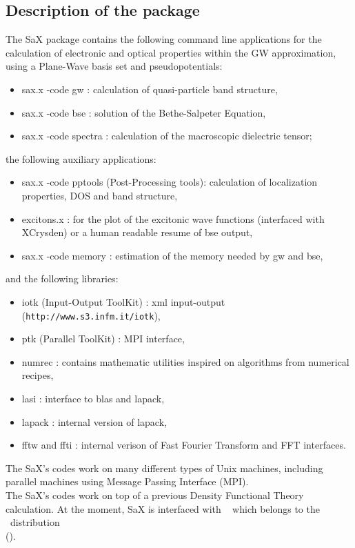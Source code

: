 \documentclass[11pt]{article}
\begin{document}
\subsection{Description of the package}
The SaX package contains the following command line applications for the
calculation of electronic and optical properties within
the GW approximation, using a Plane-Wave basis set and
pseudopotentials:
\begin{itemize}
  \item sax.x -code gw : calculation of quasi-particle band structure,
  \item sax.x -code bse : solution of the Bethe-Salpeter Equation,
  \item sax.x -code spectra : calculation of the macroscopic dielectric tensor;
\end{itemize}
the following auxiliary applications:
\begin{itemize}
  \item sax.x -code pptools (Post-Processing tools): calculation of localization properties, DOS and band structure,
  \item excitons.x : for the plot of the excitonic wave functions (interfaced with XCrysden) or a human readable resume of bse output,
  \item sax.x -code memory : estimation of the memory needed by gw and bse,
\end{itemize}
and the following libraries:
\begin{itemize}
  \item iotk (Input-Output ToolKit) : xml input-output (\texttt{http://www.s3.infm.it/iotk}),
  \item ptk (Parallel ToolKit) : MPI interface,
  \item numrec : contains mathematic utilities inspired on algorithms from numerical recipes,
  \item lasi : interface to blas and lapack,
  \item lapack : internal version of lapack,
  \item fftw and ffti : internal verison of Fast Fourier Transform  and FFT interfaces. \\
\end{itemize}

The SaX's codes work on many different types of Unix machines,
including parallel machines using Message Passing Interface (MPI). \\

The SaX's codes work on top of a previous Density Functional Theory calculation. At the moment, SaX is interfaced with \PWSCF~ which belongs to the \ESPRESSO~distribution \\
(\ESPRESSOURL). \\
\end{document}
